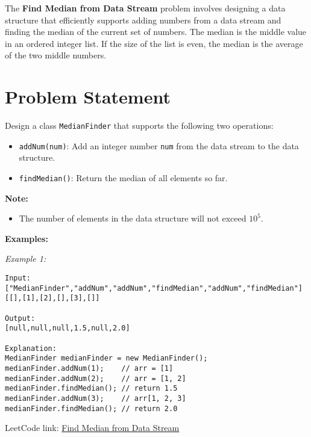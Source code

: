 \label{problem:find_median_from_data_stream}

The \textbf{Find Median from Data Stream} problem involves designing a data structure that efficiently supports adding numbers from a data stream and finding the median of the current set of numbers. The median is the middle value in an ordered integer list. If the size of the list is even, the median is the average of the two middle numbers.

\section*{Problem Statement}

Design a class \texttt{MedianFinder} that supports the following two operations:

\begin{itemize}
    \item \texttt{addNum(num)}: Add an integer number \texttt{num} from the data stream to the data structure.
    \item \texttt{findMedian()}: Return the median of all elements so far.
\end{itemize}

\textbf{Note:}
\begin{itemize}
    \item The number of elements in the data structure will not exceed \(10^5\).
\end{itemize}

\textbf{Examples:}

\textit{Example 1:}

\begin{verbatim}
Input:
["MedianFinder","addNum","addNum","findMedian","addNum","findMedian"]
[[],[1],[2],[],[3],[]]

Output:
[null,null,null,1.5,null,2.0]

Explanation:
MedianFinder medianFinder = new MedianFinder();
medianFinder.addNum(1);    // arr = [1]
medianFinder.addNum(2);    // arr = [1, 2]
medianFinder.findMedian(); // return 1.5
medianFinder.addNum(3);    // arr[1, 2, 3]
medianFinder.findMedian(); // return 2.0
\end{verbatim}

LeetCode link: \href{https://leetcode.com/problems/find-median-from-data-stream/}{Find Median from Data Stream}

